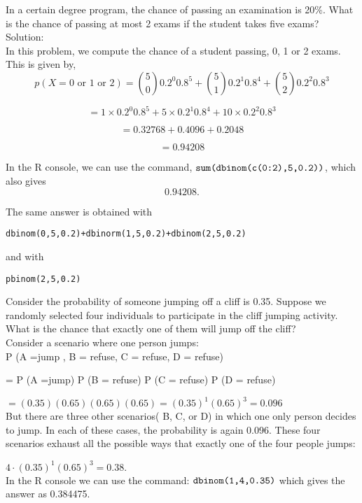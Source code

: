 \documentclass[12pt,a4paper]{article}
\theoremstyle{regla}
\theoremstyle{remark}
\theoremstyle{definition}
\theoremstyle{nonumberbreak}
\begin{document}
\begin{xmpl} 

In a certain degree program, the chance of passing an examination is 20\%. What is the chance of passing at most 2 exams if the student takes five exams?\\

Solution:\\
In this problem, we compute the chance of a student passing, 0, 1 or 2 exams. This is given by, 
$$p(X=0 \text{ or }1 \text{ or }2)={5\choose 0}0.2^0 0.8^5 +{5\choose 1}0.2^1 0.8^4 +{5\choose 2}0.2^2 0.8^3 $$

$$=1\times0.2^0 0.8^5 +5\times 0.2^1 0.8^4 +10\times0.2^2 0.8^3 $$

$$=0.32768+0.4096+0.2048$$

$$=0.94208$$

In the R console, we can use the command,
$\verb|sum(dbinom(c(0:2),5,0.2))|$,
which also gives $$0.94208.$$

The same answer is obtained with

\begin{lstlisting}
dbinom(0,5,0.2)+dbinorm(1,5,0.2)+dbinom(2,5,0.2)
\end{lstlisting}

and with
\begin{lstlisting}
pbinom(2,5,0.2)
\end{lstlisting}

\end{xmpl} 
\begin{xmpl} 

Consider the probability of someone jumping off a cliff is 0.35. Suppose we randomly selected four individuals to participate in the cliff jumping activity.
What is the chance that exactly one of them will jump off the cliff?\\

Consider a scenario where one person jumps:\\
P (A =jump , B = refuse, C = refuse, D = refuse)

= P (A =jump) P (B = refuse) P (C = refuse) P (D = refuse)

$= (0.35)(0.65)(0.65)(0.65) = (0.35)^1 (0.65)^3 = 0.096$\\

But there are three other scenarios( B, C, or D) in which one only person decides to jump. In each of these cases, the probability is again 0.096. These four scenarios exhaust all the possible ways that exactly one of the four people jumps:

$4 \cdot (0.35)^1 (0.65)^3 = 0.38.$\\

In the R console we can use the command:
$\verb|dbinom(1,4,0.35)|$
which gives the answer as  0.384475.
\end{xmpl} 
\end{document}
